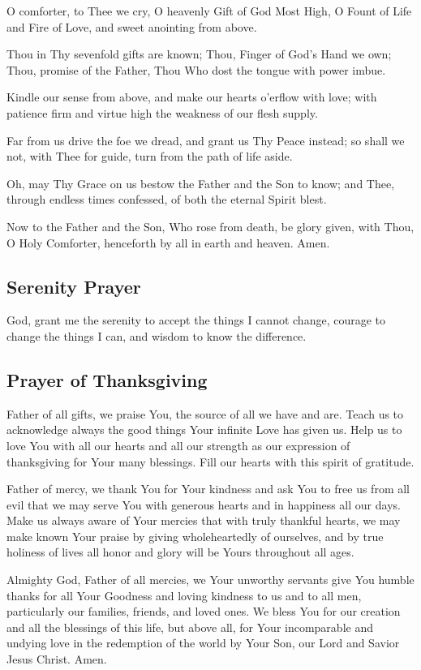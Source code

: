 \documentclass[12pt]{article}
\newcommand{\prayertitle}[1]{\subsection{#1}}
\begin{document}
O comforter, to Thee we cry,
O heavenly Gift of God Most High,
O Fount of Life and Fire of Love,
and sweet anointing from above.

Thou in Thy sevenfold gifts are known;
Thou, Finger of God's Hand we own;
Thou, promise of the Father, Thou
Who dost the tongue with power imbue.

Kindle our sense from above,
and make our hearts o'erflow with love;
with patience firm and virtue high
the weakness of our flesh supply.

Far from us drive the foe we dread,
and grant us Thy Peace instead;
so shall we not, with Thee for guide,
turn from the path of life aside.

Oh, may Thy Grace on us bestow
the Father and the Son to know;
and Thee, through endless times confessed,
of both the eternal Spirit blest.

Now to the Father and the Son,
Who rose from death, be glory given,
with Thou, O Holy Comforter,
henceforth by all in earth and heaven.
Amen.

\prayertitle{Serenity Prayer}
God, grant me the serenity to accept the things I cannot change,
courage to change the things I can,
and wisdom to know the difference.

\prayertitle{Prayer of Thanksgiving}
Father of all gifts, we praise You, the source of all we have and are.
Teach us to acknowledge always the good things Your infinite Love has given us.
Help us to love You with all our hearts and all our strength as our expression of thanksgiving for Your many blessings.
Fill our hearts with this spirit of gratitude.

Father of mercy, we thank You for Your kindness and ask You to free us from all evil that we may serve You with generous hearts and in happiness all our days.
Make us always aware of Your mercies that with truly thankful hearts, we may make known Your praise by giving wholeheartedly of ourselves, and by true holiness of lives all honor and glory will be Yours throughout all ages.

Almighty God, Father of all mercies, we Your unworthy servants give You humble thanks for all Your Goodness and loving kindness to us and to all men, particularly our families, friends, and loved ones.
We bless You for our creation and all the blessings of this life, but above all, for Your incomparable and undying love in the redemption of the world by Your Son, our Lord and Savior Jesus Christ.
Amen.
\end{document}
